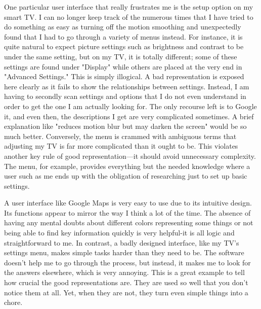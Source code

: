\documentclass[
	letterpaper, %
]{jdf}
\begin{document}
One particular user interface that really frustrates me is the setup option on my smart TV. I can no longer keep track of the numerous times that I have tried to do something as easy as turning off the motion smoothing and unexpectedly found that I had to go through a variety of menus instead. For instance, it is quite natural to expect picture settings such as brightness and contrast to be under the same setting, but on my TV, it is totally different; some of these settings are found under "Display" while others are placed at the very end in "Advanced Settings." This is simply illogical. A bad representation is exposed here clearly as it fails to show the relationships between settings. Instead, I am having to secondly scan settings and options that I do not even understand in order to get the one I am actually looking for. The only recourse left is to Google it, and even then, the descriptions I get are very complicated sometimes. A brief explanation like "reduces motion blur but may darken the screen" would be so much better. Conversely, the menu is crammed with ambiguous terms that adjusting my TV is far more complicated than it ought to be. This violates another key rule of good representation—it should avoid unnecessary complexity. The menu, for example, provides everything but the needed knowledge where a user such as me ends up with the obligation of researching just to set up basic settings. 

A user interface like Google Maps is very easy to use due to its intuitive design. Its functions appear to mirror the way I think a lot of the time. The absence of having any mental doubts about different colors representing some things or not being able to find key information quickly is very helpful-it is all logic and straightforward to me. In contrast, a badly designed interface, like my TV's settings menu, makes simple tasks harder than they need to be. The software doesn't help me to go through the process, but instead, it makes me to look for the answers elsewhere, which is very annoying. This is a great example to tell how crucial the good representations are. They are used so well that you don't notice them at all. Yet, when they are not, they turn even simple things into a chore. 

\newpage
\end{document}
